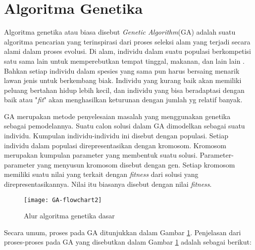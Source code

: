 \section{Algoritma Genetika}
\label{sec:GA}
Algoritma genetika atau biasa disebut \textit{Genetic Algorithm}(GA) adalah suatu algoritma pencarian yang terinspirasi dari proses seleksi alam yang terjadi secara alami dalam proses evolusi. Di alam, individu dalam suatu populasi berkompetisi satu sama lain untuk memperebutkan tempat tinggal, makanan, dan lain lain \cite{sivanandam2007introduction}. Bahkan setiap individu dalam spesies yang sama pun harus bersaing menarik lawan jenis untuk berkembang biak. Individu yang kurang baik akan memiliki peluang bertahan hidup lebih kecil, dan individu yang bisa beradaptasi dengan baik atau "\textit{fit}" akan menghasilkan keturunan dengan jumlah yg relatif banyak. 

GA merupakan metode penyelesaian masalah yang menggunakan genetika sebagai pemodelannya. Suatu calon solusi dalam GA dimodelkan sebagai suatu individu. Kumpulan individu-individu ini disebut dengan populasi. Setiap individu dalam populasi direpresentasikan dengan kromosom. Kromosom merupakan kumpulan parameter yang membentuk suatu solusi. Parameter-parameter yang menyusun kromosom disebut dengan gen. Setiap kromosom memiliki suatu nilai yang terkait dengan \textit{fitness} dari solusi yang direpresentasikannya. Nilai itu biasanya disebut dengan nilai \textit{fitness}.


\begin{figure}[H]
	\centering
	\texttt{[image: GA-flowchart2]}
	\caption{Alur algoritma genetika dasar}
	\label{fig:GA-flowchart}
\end{figure}

Secara umum, proses pada GA ditunjukkan dalam Gambar \ref{fig:GA-flowchart}. Penjelasan dari proses-proses pada GA yang disebutkan dalam Gambar \ref{fig:GA-flowchart} adalah sebagai berikut:

